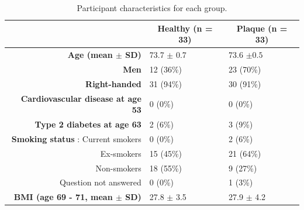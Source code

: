 \documentclass[12pt]{spieman}  %
\begin{document}
\begin{spacing}{2}
\begin{table}[]
\caption{Participant characteristics for each group.}
\begin{center}
\begin{tabular}{r|l|l|}
\cline{2-3}
\multicolumn{1}{l|}{}                                                             & \multicolumn{1}{c|}{\textbf{Healthy (n = 33)}} & \multicolumn{1}{c|}{\textbf{Plaque (n = 33)}} \\ \hline
\multicolumn{1}{|r|}{\textbf{Age (mean $\pm$ SD) }}                                              & 73.7  $\pm$ 0.7                                       & 73.6 $\pm 0.5$                                     \\ \hline
\multicolumn{1}{|r|}{\textbf{Men }}                                              & 12 (36\%)                                      & 23 (70\%)                                     \\ \hline
\multicolumn{1}{|r|}{\textbf{Right-handed}}                                       & 31 (94\%)                                      & 30 (91\%)                                     \\ \hline
\multicolumn{1}{|r|}{\textbf{Cardiovascular disease at age 53}}                   & 0 (0\%)                                        & 0 (0\%)                                       \\ \hline
\multicolumn{1}{|r|}{\textbf{Type 2 diabetes at age 63}}                          & 2 (6\%)                                        & 3 (9\%)                                       \\ \hline
\multicolumn{1}{|r|}{\textbf{Smoking status }: Current smokers}                           & 0 (0\%)                                        & 2 (6\%)                                       \\ \hline
\multicolumn{1}{|r|}{Ex-smokers}                                                  & 15 (45\%)                                      & 21 (64\%)                                     \\ \hline
\multicolumn{1}{|r|}{Non-smokers}                                                 & 18 (55\%)                                      & 9 (27\%)                                      \\ \hline
\multicolumn{1}{|r|}{Question not answered}                                                     & 0 (0\%)                                        & 1 (3\%)                                       \\ \hline
\multicolumn{1}{|r|}{\textbf{BMI (age 69 - 71, mean $\pm$ SD)}}                     & 27.8 $\pm$ 3.5                                   & 27.9 $\pm$ 4.2                                  \\ \hline

\end{tabular}
\end{center}
\end{table}
\end{spacing}
\end{document}
